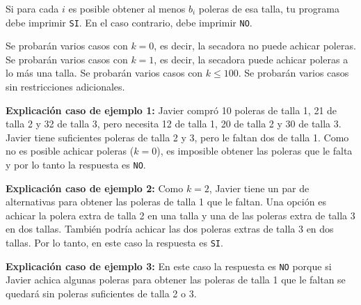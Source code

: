 \documentclass{oci}
\begin{document}
\begin{outputDescription}
Si para cada $i$ es posible obtener al menos $b_i$ poleras de esa talla, tu programa debe imprimir
\texttt{SI}.
En el caso contrario, debe imprimir \texttt{NO}.
\end{outputDescription}

\begin{scoreDescription}
  Se probarán varios casos con $k=0$, es decir, la secadora no puede achicar poleras.
  Se probarán varios casos con $k=1$, es decir, la secadora puede achicar poleras a lo más una talla.
  Se probarán varios casos con $k \leq 100$.
  Se probarán varios casos sin restricciones adicionales.
\end{scoreDescription}

\begin{sampleDescription}
\begin{center}
    \begin{minipage}{0.94\textwidth}
    \textbf{Explicación caso de ejemplo 1:} Javier compró 10 poleras de talla 1, 21 de talla 2 y 32 de talla 3,
    pero necesita 12 de talla 1, 20 de talla 2 y 30 de talla 3.
    Javier tiene suficientes poleras de talla 2 y 3, pero le faltan dos de talla 1.
    Como no es posible achicar poleras ($k=0$), es imposible obtener las poleras que le falta y por
    lo tanto la respuesta es \texttt{NO}.
    \end{minipage}
\end{center}

\begin{center}
    \begin{minipage}{0.94\textwidth}
    \textbf{Explicación caso de ejemplo 2:} Como $k=2$, Javier tiene un par de alternativas para obtener
    las poleras de talla 1 que le faltan.
    Una opción es achicar la polera extra de talla 2 en una talla y una de las poleras extra de
    talla 3 en dos tallas.
    También podría achicar las dos poleras extras de talla 3 en dos tallas.
    Por lo tanto, en este caso la respuesta es \texttt{SI}.
    \end{minipage}
\end{center}

\begin{center}
    \begin{minipage}{0.94\textwidth}
    \textbf{Explicación caso de ejemplo 3:} En este caso la respuesta es \texttt{NO} porque si Javier
    achica algunas poleras para obtener las poleras de talla 1 que le faltan se quedará sin poleras
    suficientes de talla 2 o 3.
    \end{minipage}
\end{center}
\end{sampleDescription}
\end{document}
